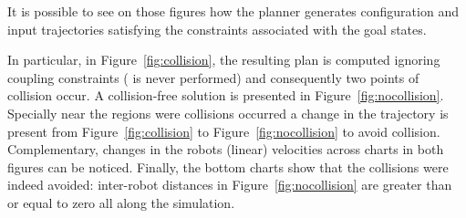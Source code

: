 \documentclass[eprint]{actapoly}
\begin{document}
It is possible to see on those figures how the planner generates configuration and 
input trajectories satisfying the constraints associated with the goal states.

In particular, in Figure~\ref{fig:collision}, the resulting plan is computed ignoring 
coupling constraints ( is never performed) and consequently two points of collision occur.
A collision-free solution is presented in Figure~\ref{fig:nocollision}.
Specially near the regions were collisions occurred a change in the trajectory is present from Figure~\ref{fig:collision} to Figure~\ref{fig:nocollision} to avoid collision. 
Complementary, changes 
in the robots (linear) velocities across charts in both figures can be noticed. Finally, the 
bottom charts show that the collisions were indeed avoided: inter-robot distances in 
Figure~\ref{fig:nocollision} are greater than or equal to zero all along the 
simulation.

\end{document}
